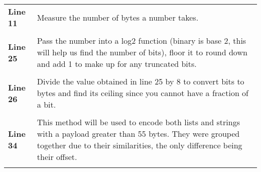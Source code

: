 \documentclass[a4paper, 12pt, titlepage]{article}
\begin{document}
\begin{onehalfspacing}
  \begin{longtable}{l p{10cm}}
    \textbf{Line 11} & Measure the number of bytes a number takes. \\ \\
    \textbf{Line 25} & Pass the number into a log2 function (binary is base 2, this will help us find the number of bits), floor it to round down and add 1 to make up for any truncated bits. \\ \\
    \textbf{Line 26} & Divide the value obtained in line 25 by 8 to convert bits to bytes and find its ceiling since you cannot have a fraction of a bit. \\ \\
    \textbf{Line 34} & This method will be used to encode both lists and strings with a payload greater than 55 bytes. They were grouped together due to their similarities, the only difference being their offset. \\ \\


\end{longtable}
\end{onehalfspacing}
\end{document}
